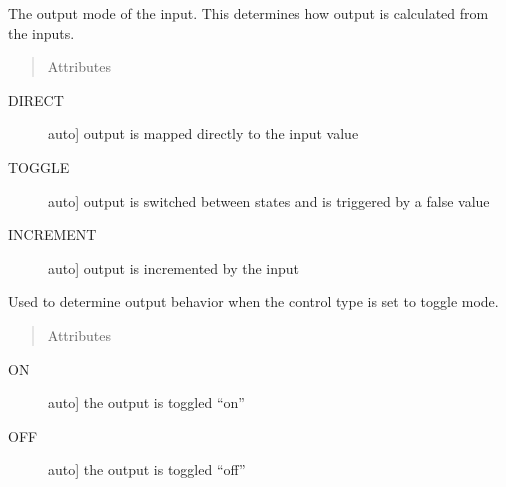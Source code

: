 \documentclass[letterpaper,10pt,english]{sphinxmanual}
\begin{document}
\begin{fulllineitems}
\label{\detokenize{base:OutputObject.ControlType}}
\sphinxAtStartPar
The output mode of the input. This determines how output is calculated from the inputs.
\begin{quote}\begin{description}
\item[{Attributes}] \leavevmode
\end{description}\end{quote}
\begin{description}
\item[{DIRECT}] \leavevmode{[}auto{]}
\sphinxAtStartPar
output is mapped directly to the input value

\item[{TOGGLE}] \leavevmode{[}auto{]}
\sphinxAtStartPar
output is switched between states and is triggered by a false value

\item[{INCREMENT}] \leavevmode{[}auto{]}
\sphinxAtStartPar
output is incremented by the input

\end{description}

\end{fulllineitems}


\begin{fulllineitems}
\label{\detokenize{base:OutputObject.ToggleState}}
\sphinxAtStartPar
Used to determine output behavior when the control type is set to toggle mode.
\begin{quote}\begin{description}
\item[{Attributes}] \leavevmode
\end{description}\end{quote}
\begin{description}
\item[{ON}] \leavevmode{[}auto{]}
\sphinxAtStartPar
the output is toggled “on”

\item[{OFF}] \leavevmode{[}auto{]}
\sphinxAtStartPar
the output is toggled “off”

\end{description}

\end{fulllineitems}
\end{document}

